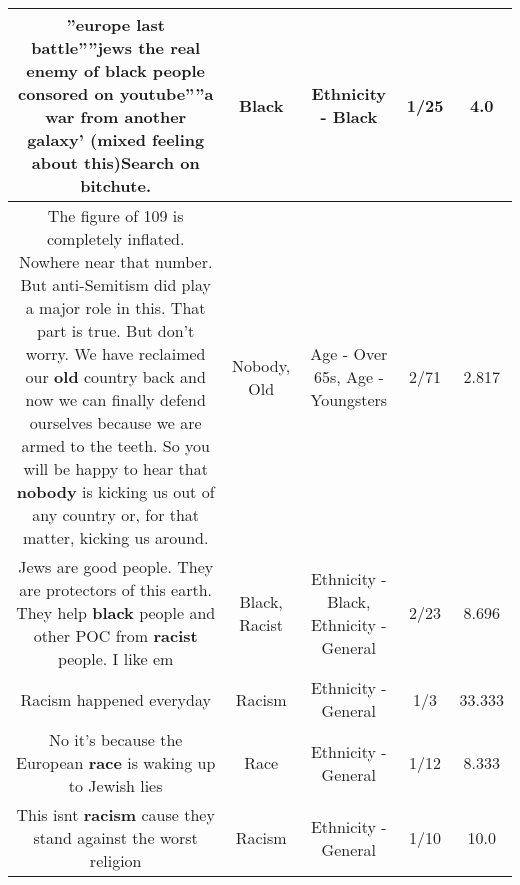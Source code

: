 \documentclass[11pt]{article}
\newlength\mylength
\begin{document}
\begin{center}
\begin{longtable}{|C{.65\mylength}|C{.30\mylength}|C{.12\mylength}|C{.12\mylength}|C{.12\mylength}|}
  \small ''europe last battle''''jews the real enemy of \textbf{black} people consored on youtube''''a war from another galaxy' (mixed feeling about this)Search on bitchute.\normalsize   & Black & Ethnicity - Black & 1/25 & 4.0 \\  \hline
  \small The figure of 109 is completely inflated. Nowhere near that number. But anti-Semitism did play a major role in this. That part is true. But don't worry. We have reclaimed our \textbf{old} country back and now we can finally defend ourselves because we are armed to the teeth. So you will be happy to hear that \textbf{nobody} is kicking us out of any country or, for that matter, kicking us around.\normalsize   & Nobody, Old & Age - Over 65s, Age - Youngsters & 2/71 & 2.817 \\  \hline
  \small Jews are good people. They are protectors of this earth. They help \textbf{black} people and other POC from \textbf{racist} people. I like em\normalsize   & Black, Racist & Ethnicity - Black, Ethnicity - General & 2/23 & 8.696 \\  \hline
  \small Racism happened everyday\normalsize   & Racism & Ethnicity - General & 1/3 & 33.333 \\  \hline
  \small No it's because the European \textbf{race} is waking up to Jewish lies\normalsize   & Race & Ethnicity - General & 1/12 & 8.333 \\  \hline
  \small This isnt \textbf{racism} cause they stand against the worst religion\normalsize   & Racism & Ethnicity - General & 1/10 & 10.0 \\  \hline

\end{longtable}
\end{center}
\end{document}
